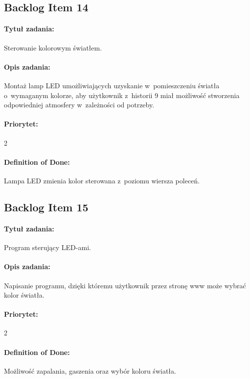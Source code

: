 	\subsection{Backlog Item 14}
	\paragraph{Tytuł zadania:}
	Sterowanie kolorowym światłem.
	
	\paragraph{Opis zadania:}
	Montaż lamp LED umożliwiających uzyskanie w~pomieszczeniu światła o~wymaganym kolorze, aby użytkownik z~historii 9 miał możliwość stworzenia odpowiedniej atmosfery w~zależności od potrzeby.
	 
	\paragraph{Priorytet:}
	2
	
	\paragraph{Definition of Done:}
	Lampa LED zmienia kolor sterowana z~poziomu wiersza poleceń.



	\subsection{Backlog Item 15}
	\paragraph{Tytuł zadania:}
	Program sterujący LED-ami.
	
	\paragraph{Opis zadania:}
	Napisanie programu, dzięki któremu użytkownik przez stronę www może wybrać kolor światła.
	
	\paragraph{Priorytet:}
	2
	
	\paragraph{Definition of Done:}
	Możliwość zapalania, gaszenia oraz wybór koloru światła.


